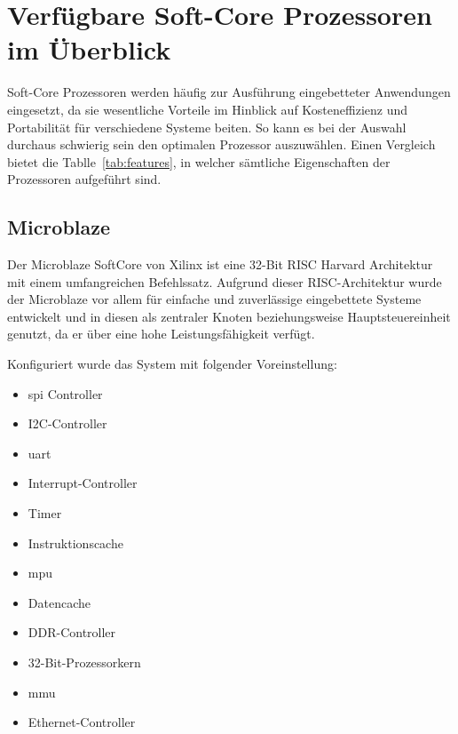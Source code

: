 \section{Verfügbare Soft-Core Prozessoren im Überblick}\label{kap:überblick}
Soft-Core Prozessoren werden häufig zur Ausführung eingebetteter Anwendungen eingesetzt, da sie wesentliche Vorteile im Hinblick auf Kosteneffizienz und Portabilität für verschiedene Systeme
beiten. So kann es bei der Auswahl durchaus schwierig sein den optimalen Prozessor auszuwählen. Einen Vergleich bietet die Tablle~\ref{tab:features}, in welcher sämtliche Eigenschaften
der Prozessoren aufgeführt sind.\\

\subsection{Microblaze}\label{kap:Microblaze}


Der Microblaze SoftCore von Xilinx ist eine 32-Bit RISC Harvard Architektur mit einem umfangreichen Befehlssatz. Aufgrund dieser RISC-Architektur
 wurde der Microblaze vor allem für einfache und zuverlässige eingebettete Systeme entwickelt und in diesen als zentraler Knoten beziehungsweise Hauptsteuereinheit
genutzt, da er über eine hohe Leistungsfähigkeit verfügt.

Konfiguriert wurde das System mit folgender Voreinstellung:~\cite{microblaze}\\
        \begin{itemize}
          \item \ac{spi} Controller
          \item I2C-Controller
          \item \ac{uart}
          \item Interrupt-Controller
          \item  Timer
          \item Instruktionscache
          \item \ac{mpu}
          \item Datencache
          \item DDR-Controller
          \item 32-Bit-Prozessorkern
          \item \ac{mmu}
          \item Ethernet-Controller
        \end{itemize}

